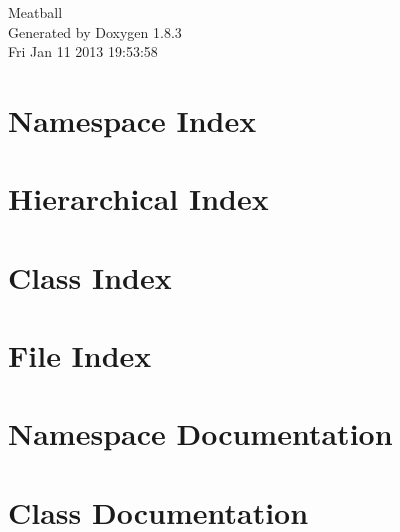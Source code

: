 \documentclass{book}
\begin{document}
\hypersetup{pageanchor=false,citecolor=blue}
\begin{titlepage}
\vspace*{7cm}
\begin{center}
{\Large Meatball }\\
\vspace*{1cm}
{\large Generated by Doxygen 1.8.3}\\
\vspace*{0.5cm}
{\small Fri Jan 11 2013 19:53:58}\\
\end{center}
\end{titlepage}
\clearemptydoublepage
{}
\tableofcontents
\clearemptydoublepage
{}
\hypersetup{pageanchor=true,citecolor=blue}
\chapter{Namespace Index}

\chapter{Hierarchical Index}

\chapter{Class Index}

\chapter{File Index}

\chapter{Namespace Documentation}

\chapter{Class Documentation}




































\end{document}
